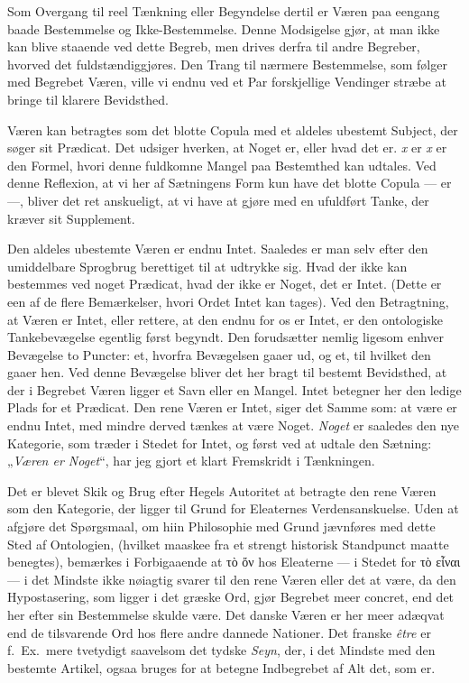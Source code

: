 \documentclass[12pt]{article}
\newcommand{\opage}[1]{\marginnote{\footnotesize\textit{[#1]}}}
\begin{document}
Som Overgang til reel Tænkning eller Begyndelse dertil er Væren paa eengang baade
Bestemmelse og Ikke-Bestemmelse. Denne Modsigelse gjør, at man ikke kan blive
staaende ved dette Begreb, men drives derfra til andre Begreber, hvorved det
fuldstændiggjøres. Den Trang til nærmere Bestemmelse, som følger med Begrebet
Væren, ville vi endnu ved et Par forskjellige Vendinger stræbe at bringe til
klarere Bevidsthed.

Væren kan betragtes som det blotte Copula med et aldeles ubestemt Subject, der
søger sit Prædicat. Det udsiger hverken, at Noget er, eller hvad det er.
\textit{x} er \textit{x} er den Formel, hvori denne fuldkomne Mangel paa
Bestemthed kan udtales. Ved denne \opage{211}Reflexion, at vi her af Sætningens
Form kun have det blotte Copula --- er ---, bliver det ret anskueligt, at vi have
at gjøre med en ufuldført Tanke, der kræver sit Supplement.

Den aldeles ubestemte Væren er endnu Intet. Saaledes er man selv efter den
umiddelbare Sprogbrug berettiget til at udtrykke sig. Hvad der ikke kan bestemmes
ved noget Prædicat, hvad der ikke er Noget, det er Intet. (Dette er een af de
flere Bemærkelser, hvori Ordet Intet kan tages). Ved den Betragtning, at Væren er
Intet, eller rettere, at den endnu for os er Intet, er den ontologiske
Tankebevægelse egentlig først begyndt. Den forudsætter nemlig ligesom enhver
Bevægelse to Puncter: et, hvorfra Bevægelsen gaaer ud, og et, til hvilket den
gaaer hen. Ved denne Bevægelse bliver det her bragt til bestemt Bevidsthed, at
der i Begrebet Væren ligger et Savn eller en Mangel. Intet betegner her den
ledige Plads for et Prædicat. Den rene Væren er Intet, siger det Samme som: at
være er endnu Intet, med mindre derved tænkes at være Noget. \emph{Noget} er
saaledes den nye Kategorie, som træder i Stedet for Intet, og først ved at udtale
den Sætning: „\emph{Væren er Noget}“, har jeg gjort et klart Fremskridt i
Tænkningen.

Det er blevet Skik og Brug efter Hegels Autoritet at betragte den rene Væren som
den Kategorie, der ligger til Grund for Eleaternes Verdensanskuelse. Uden at
afgjøre det Spørgsmaal, om hiin Philosophie med Grund jævnføres med dette Sted af
Ontologien, (hvilket maaskee fra et strengt historisk Standpunct maatte
benegtes), bemærkes i Forbigaaende at τὸ ὄν hos Eleaterne --- i Stedet for
τὸ εἶναι --- i det Mindste ikke nøiagtig svarer til den rene Væren eller det at
være, da den Hypostasering, som ligger i det græske Ord, gjør Begrebet meer
concret, end det her efter sin Bestemmelse skulde være. Det danske Væren er her
meer adæqvat end de tilsvarende Ord hos flere \opage{212}andre dannede Nationer.
Det franske \textit{être} er f.\ Ex.\ mere tvetydigt saavelsom det tydske
\emph{Seyn}, der, i det Mindste med den bestemte Artikel, ogsaa bruges for at
betegne Indbegrebet af Alt det, som er.
\end{document}
